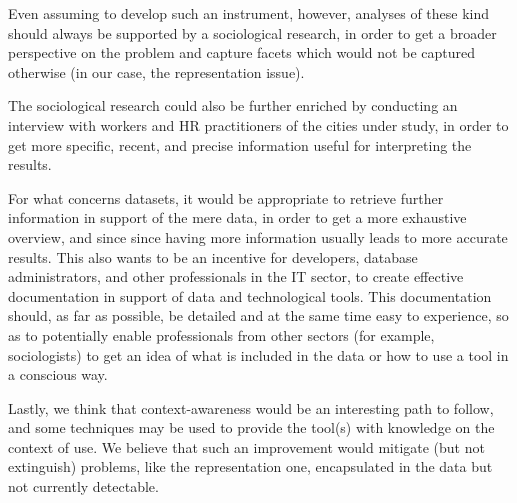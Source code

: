 Even assuming to develop such an instrument, however, analyses of these kind should always be supported by a sociological research, in order to get a broader perspective on the problem and capture facets which would not be captured otherwise (in our case, the representation issue).

The sociological research could also be further enriched by conducting an interview with workers and HR practitioners of the cities under study, in order to get more specific, recent, and precise information useful for interpreting the results.

For what concerns datasets, it would be appropriate to retrieve further information in support of the mere data, in order to get a more exhaustive overview, and since since having more information usually leads to more accurate results. This also wants to be an incentive for developers, database administrators, and other professionals in the IT sector, to create effective documentation in support of data and technological tools. This documentation should, as far as possible, be detailed and at the same time easy to experience, so as to potentially enable professionals from other sectors (for example, sociologists) to get an idea of what is included in the data or how to use a tool in a conscious way.

Lastly, we think that context-awareness would be an interesting path to follow, and some techniques may be used to provide the tool(s) with knowledge on the context of use. We believe that such an improvement would mitigate (but not extinguish) problems, like the representation one, encapsulated in the data but not currently detectable.

